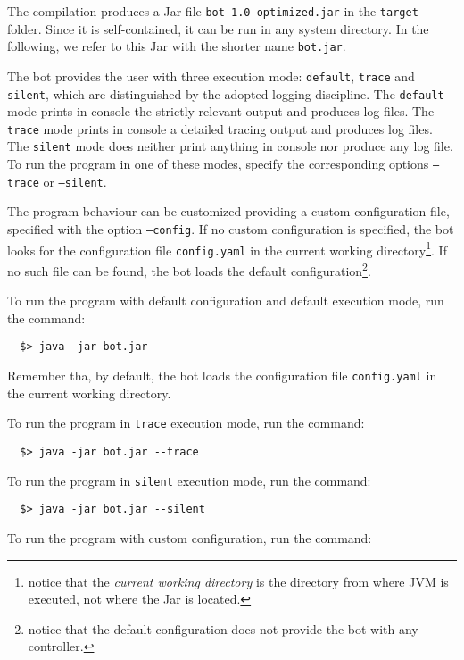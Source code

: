The compilation produces a Jar file \texttt{bot-1.0-optimized.jar} in the \texttt{target} folder. Since it is self-contained, it can be run in any system directory. In the following, we refer to this Jar with the shorter name \texttt{bot.jar}.

The bot provides the user with three execution mode: \texttt{default}, \texttt{trace} and \texttt{silent}, which are distinguished by the adopted logging discipline. The \texttt{default} mode prints in console the strictly relevant output and produces log files. The \texttt{trace} mode prints in console a detailed tracing output and produces log files. The \texttt{silent} mode does neither print anything in console nor produce any log file.
To run the program in one of these modes, specify the corresponding options \texttt{--trace} or \texttt{--silent}.

The program behaviour can be customized providing a custom configuration file, specified with the option \texttt{--config}.
If no custom configuration is specified, the bot looks for the configuration file \texttt{config.yaml} in the current working directory\footnote{notice that the \textit{current working directory} is the directory from where JVM is executed, not where the Jar is located.}. If no such file can be found, the bot loads the default configuration\footnote{notice that the default configuration does not provide the bot with any controller.}.

To run the program with default configuration and default execution mode, run the command:

\begin{verbatim}
  $> java -jar bot.jar
\end{verbatim}

Remember tha, by default, the bot loads the configuration file \texttt{config.yaml} in the current working directory.

To run the program in \texttt{trace} execution mode, run the command:

\begin{verbatim}
  $> java -jar bot.jar --trace
\end{verbatim}

To run the program in \texttt{silent} execution mode, run the command:

\begin{verbatim}
  $> java -jar bot.jar --silent
\end{verbatim}

To run the program with custom configuration, run the command:

